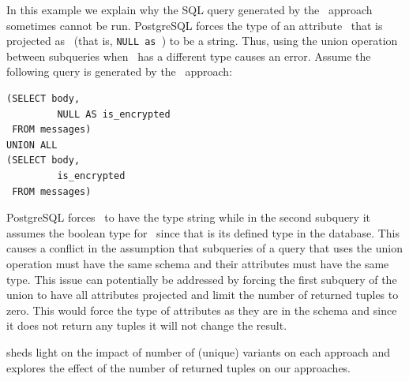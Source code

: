 \begin{example}
\label{eg:uav-fail}
In this example we explain why the SQL query generated by the \uav\ approach
sometimes cannot be run. PostgreSQL forces the type of an attribute \vAtt\ that is projected as \nul\
(that is, \texttt{NULL as \vAtt}) to be a string. Thus, using the union operation between 
subqueries when \vAtt\ has a different type causes an error. Assume the following query is 
generated by the \uav\ approach:
%
\begin{lstlisting}[basicstyle=\footnotesize\ttfamily,columns=flexible,lineskip=0.5\baselineskip]
(SELECT body,
         NULL AS is_encrypted
 FROM messages)
UNION ALL
(SELECT body,
         is_encrypted
 FROM messages)
\end{lstlisting}
%
PostgreSQL forces \isencrypted\ to have the type string while in the second subquery it assumes the boolean 
type for \isencrypted\ since that is its defined type in the  database. This causes a conflict in the assumption
that subqueries of a query that uses the union operation must have the same schema and their 
attributes must have the same type.
%
This issue can potentially be addressed by forcing the first subquery of the union 
to have all attributes projected and limit the number of returned tuples to zero. This would 
force the type of attributes as they are in the schema and since it does not return any tuples
it will not change the result. 
\end{example}

 sheds light on the impact of number of (unique) variants on each approach and
\secref{exp-tuples} explores the effect of the number of returned tuples on our approaches. 

